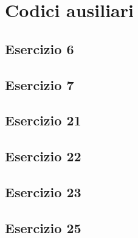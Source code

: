 \section{Codici ausiliari}

\subsection{Esercizio 6}

 
\subsection{Esercizio 7}


\subsection{Esercizio 21}


\subsection{Esercizio 22}


\subsection{Esercizio 23}


\subsection{Esercizio 25}

